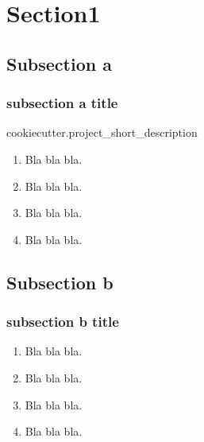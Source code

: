 \section{Section1}
%
\subsection{Subsection a}
\begin{frame}[label=sectiona]
\frametitle{subsection a title} 

{{cookiecutter.project_short_description}}

\begin{enumerate}
\item Bla bla bla.
\item Bla bla bla.
\item Bla bla bla.
\item Bla bla bla.
\end{enumerate}
\end{frame}


%
\subsection{Subsection b}
\begin{frame}[label=sectionb]
\frametitle{subsection b title} 
\begin{enumerate}
\item Bla bla bla.
\item Bla bla bla.
\item Bla bla bla.
\item Bla bla bla.
\end{enumerate}
\end{frame}
